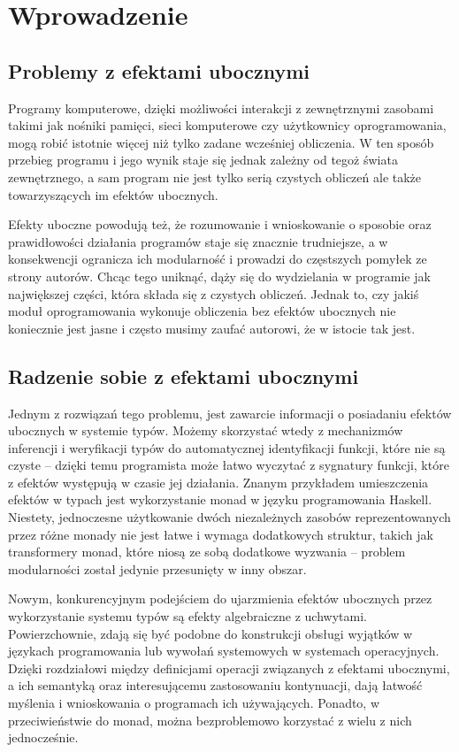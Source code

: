\chapter{Wprowadzenie}

\section{Problemy z efektami ubocznymi}

Programy komputerowe, dzięki możliwości interakcji z zewnętrznymi zasobami takimi jak nośniki pamięci, sieci komputerowe czy użytkownicy oprogramowania, mogą robić istotnie więcej niż tylko zadane wcześniej obliczenia. W ten sposób przebieg programu i jego wynik staje się jednak zależny od tegoż świata zewnętrznego, a sam program nie jest tylko serią czystych obliczeń ale także towarzyszących im efektów ubocznych.

Efekty uboczne powodują też, że rozumowanie i wnioskowanie o sposobie oraz prawidłowości działania programów staje się znacznie trudniejsze, a w konsekwencji ogranicza ich modularność i prowadzi do częstszych pomyłek ze strony autorów. Chcąc tego uniknąć, dąży się do wydzielania w programie jak największej części, która składa się z czystych obliczeń. Jednak to, czy jakiś moduł oprogramowania wykonuje obliczenia bez efektów ubocznych nie koniecznie jest jasne i często musimy zaufać autorowi, że w istocie tak jest.

\section{Radzenie sobie z efektami ubocznymi}

Jednym z rozwiązań tego problemu, jest zawarcie informacji o posiadaniu efektów ubocznych w systemie typów. Możemy skorzystać wtedy z mechanizmów inferencji i weryfikacji typów do automatycznej identyfikacji funkcji, które nie są czyste -- dzięki temu programista może łatwo wyczytać z sygnatury funkcji, które z efektów występują w czasie jej działania. Znanym przykładem umieszczenia efektów w typach jest wykorzystanie monad w języku programowania Haskell. Niestety, jednoczesne użytkowanie dwóch niezależnych zasobów reprezentowanych przez różne monady nie jest łatwe i wymaga dodatkowych struktur, takich jak transformery monad, które niosą ze sobą dodatkowe wyzwania -- problem modularności został jedynie przesunięty w inny obszar.

Nowym, konkurencyjnym podejściem do ujarzmienia efektów ubocznych przez wykorzystanie systemu typów są efekty algebraiczne z uchwytami. Powierzchownie, zdają się być podobne do konstrukcji obsługi wyjątków w językach programowania lub wywołań systemowych w systemach operacyjnych. Dzięki rozdziałowi między definicjami operacji związanych z efektami ubocznymi, a ich semantyką oraz interesującemu zastosowaniu kontynuacji, dają łatwość myślenia i wnioskowania o programach ich używających. Ponadto, w przeciwieństwie do monad, można bezproblemowo korzystać z wielu z nich jednocześnie.

